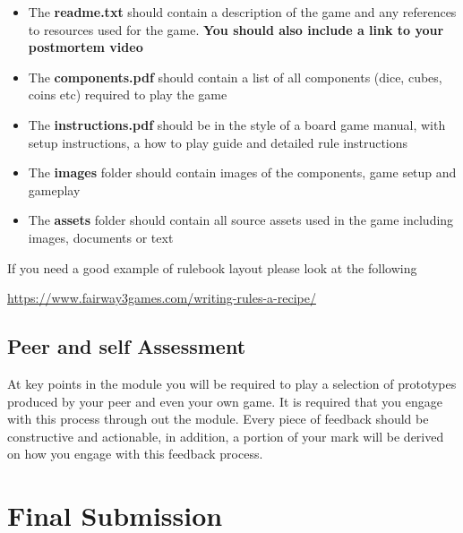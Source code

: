 \documentclass{../../fal_assignment}
\begin{document}
\begin{itemize}
	\item The \textbf{readme.txt} should contain a description of the game and any references to resources used for the game. \textbf{You should also include a link to your postmortem video}
	\item The \textbf{components.pdf} should contain a list of all components (dice, cubes, coins etc) required to play the game
	\item The \textbf{instructions.pdf} should be in the style of a board game manual, with setup instructions, a how to play guide and detailed rule instructions
	\item The \textbf{images} folder should contain images of the components, game setup and gameplay
	\item The \textbf{assets} folder should contain all source assets used in the game including images, documents or text
\end{itemize}

If you need a good example of rulebook layout please look at the following

\url{https://www.fairway3games.com/writing-rules-a-recipe/}

\subsection*{Peer and self Assessment}
At key points in the module you will be required to play a selection of prototypes produced by your peer and even your own game. It is required that you engage with
this process through out the module. Every piece of feedback should be constructive and actionable, in addition, a portion of your mark will be derived on how you engage with this feedback process. 

\pagebreak
\section*{Final Submission} 
\end{document}
